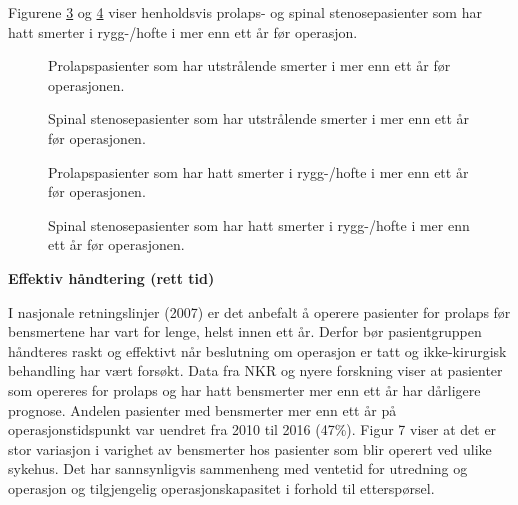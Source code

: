 \documentclass [norsk,a4paper,twoside]{article}\usepackage[]{graphicx}\usepackage[]{color}
\begin{document}
Figurene \ref{fig:VarighSmerteRyggAvdPro} og \ref{fig:VarighSmerteRyggAvdSS} viser henholdsvis prolaps- og spinal stenosepasienter som har hatt smerter i rygg-/hofte i mer enn ett år før operasjon.

\begin{figure}[h] 
\caption{Prolapspasienter som har utstrålende smerter
i mer enn ett år før operasjonen.}
\label{fig:VarighSmerteUtstrAvdPro}
\end{figure}
\begin{figure}[h] 
\caption{Spinal stenosepasienter som har utstrålende smerter
i mer enn ett år før operasjonen.}
\label{fig:VarighSmerteUtstrAvdSS}
\end{figure}

\begin{figure}[h] 
\caption{Prolapspasienter som har hatt smerter i rygg-/hofte
i mer enn ett år før operasjonen.}
\label{fig:VarighSmerteRyggAvdPro}
\end{figure}
\begin{figure}[h] 
\caption{Spinal stenosepasienter som har hatt smerter i rygg-/hofte
i mer enn ett år før operasjonen.}
\label{fig:VarighSmerteRyggAvdSS}
\end{figure}


\textbf{Effektiv håndtering (rett tid)}

I nasjonale retningslinjer (2007) er det anbefalt å operere pasienter for prolaps før
bensmertene har vart for lenge, helst innen ett år. Derfor bør
pasientgruppen håndteres raskt og effektivt når beslutning om operasjon er tatt og
ikke-kirurgisk behandling har vært forsøkt. Data fra NKR og nyere forskning viser at
pasienter som opereres for prolaps og har hatt bensmerter mer enn ett år har
dårligere prognose. Andelen pasienter med bensmerter mer enn ett år på
operasjonstidspunkt var uendret fra 2010 til 2016 (47\%).
Figur 7 viser at det er stor variasjon i varighet av bensmerter hos pasienter som blir
operert ved ulike sykehus. Det har sannsynligvis sammenheng med ventetid for
utredning og operasjon og tilgjengelig operasjonskapasitet i forhold til etterspørsel.


\clearpage
\end{document}
